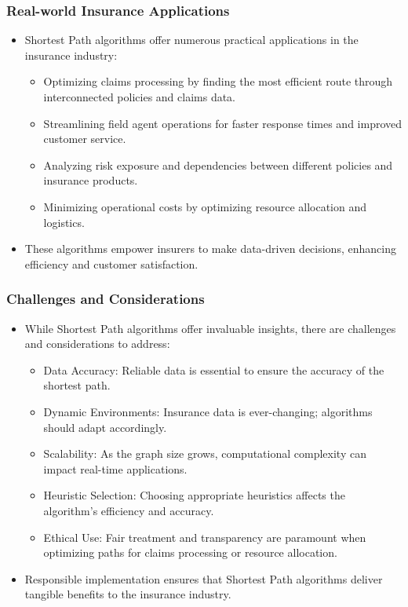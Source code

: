 \begin{frame}[fragile]\frametitle{Real-world Insurance Applications}
\begin{itemize}
\item Shortest Path algorithms offer numerous practical applications in the insurance industry:
\begin{itemize}
\item Optimizing claims processing by finding the most efficient route through interconnected policies and claims data.
\item Streamlining field agent operations for faster response times and improved customer service.
\item Analyzing risk exposure and dependencies between different policies and insurance products.
\item Minimizing operational costs by optimizing resource allocation and logistics.
\end{itemize}
\item These algorithms empower insurers to make data-driven decisions, enhancing efficiency and customer satisfaction.
\end{itemize}
\end{frame}

\begin{frame}[fragile]\frametitle{Challenges and Considerations}
\begin{itemize}
\item While Shortest Path algorithms offer invaluable insights, there are challenges and considerations to address:
\begin{itemize}
\item Data Accuracy: Reliable data is essential to ensure the accuracy of the shortest path.
\item Dynamic Environments: Insurance data is ever-changing; algorithms should adapt accordingly.
\item Scalability: As the graph size grows, computational complexity can impact real-time applications.
\item Heuristic Selection: Choosing appropriate heuristics affects the algorithm's efficiency and accuracy.
\item Ethical Use: Fair treatment and transparency are paramount when optimizing paths for claims processing or resource allocation.
\end{itemize}
\item Responsible implementation ensures that Shortest Path algorithms deliver tangible benefits to the insurance industry.
\end{itemize}
\end{frame}


